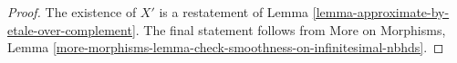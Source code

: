 \documentclass[10pt,a4paper]{amsart}
\theoremstyle{plain}
\theoremstyle{definition}
\theoremstyle{remark}
\numberwithin{equation}{subsection}
\begin{document}
\begin{proof}
The existence of $X'$ is a restatement of
Lemma \ref{lemma-approximate-by-etale-over-complement}.
The final statement follows from
More on Morphisms, Lemma
\ref{more-morphisms-lemma-check-smoothness-on-infinitesimal-nbhds}.
\end{proof}
\end{document}
